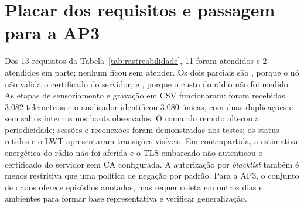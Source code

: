 \section{Placar dos requisitos e passagem para a AP3}
Dos 13 requisitos da Tabela~\ref{tab:rastreabilidade}, 11 foram atendidos e 2 atendidos em parte; nenhum ficou sem atender. Os dois parciais são , porque o nó não valida o certificado do servidor, e , porque o custo do rádio não foi medido. As etapas de sensoriamento e gravação em CSV funcionaram: foram recebidas 3.082 telemetrias e o analisador identificou 3.080 únicas, com duas duplicações e sem saltos internos nos boots observados. O comando remoto alterou a periodicidade; sessões e reconexões foram demonstradas nos testes; os status retidos e o LWT apresentaram transições visíveis. Em contrapartida, a estimativa energética do rádio não foi aferida e o TLS embarcado não autenticou o certificado do servidor sem CA configurada. A autorização por \emph{blacklist} também é menos restritiva que uma política de negação por padrão. Para a AP3, o conjunto de dados oferece episódios anotados, mas requer coleta em outros dias e ambientes para formar base representativa e verificar generalização.
